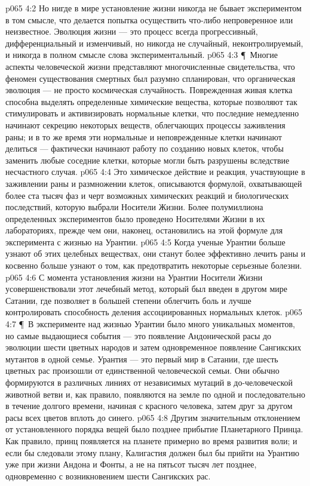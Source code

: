 \vs p065 4:2 Но нигде в мире установление жизни никогда не бывает экспериментом в том смысле, что делается попытка осуществить что\hyp{}либо непроверенное или неизвестное. Эволюция жизни --- это процесс всегда прогрессивный, дифференциальный и изменчивый, но никогда не случайный, неконтролируемый, и никогда в полном смысле слова экспериментальный.
\vs p065 4:3 \P\ Многие аспекты человеческой жизни представляют многочисленные свидетельства, что феномен существования смертных был разумно спланирован, что органическая эволюция --- не просто космическая случайность. Поврежденная живая клетка способна выделять определенные химические вещества, которые позволяют так стимулировать и активизировать нормальные клетки, что последние немедленно начинают секрецию некоторых веществ, облегчающих процессы заживления раны; и в то же время эти нормальные и неповрежденные клетки начинают делиться --- фактически начинают работу по созданию новых клеток, чтобы заменить любые соседние клетки, которые могли быть разрушены вследствие несчастного случая.
\vs p065 4:4 Это химическое действие и реакция, участвующие в заживлении раны и размножении клеток, описываются формулой, охватывающей более ста тысяч фаз и черт возможных химических реакций и биологических последствий, которую выбрали Носители Жизни. Более полумиллиона определенных экспериментов было проведено Носителями Жизни в их лабораториях, прежде чем они, наконец, остановились на этой формуле для эксперимента с жизнью на Урантии.
\vs p065 4:5 Когда ученые Урантии больше узнают об этих целебных веществах, они станут более эффективно лечить раны и косвенно больше узнают о том, как предотвратить некоторые серьезные болезни.
\vs p065 4:6 С момента установления жизни на Урантии Носители Жизни усовершенствовали этот лечебный метод, который был введен в другом мире Сатании, где позволяет в большей степени облегчить боль и лучше контролировать способность деления ассоциированных нормальных клеток.
\vs p065 4:7 \P\ В эксперименте над жизнью Урантии было много уникальных моментов, но самые выдающиеся события --- это появление Андонической расы до эволюции шести цветных народов и затем одновременное появление Сангикских мутантов в одной семье. Урантия --- это первый мир в Сатании, где шесть цветных рас произошли от единственной человеческой семьи. Они обычно формируются в различных линиях от независимых мутаций в до\hyp{}человеческой животной ветви и, как правило, появляются на земле по одной и последовательно в течение долгого времени, начиная с красного человека, затем друг за другом расы всех цветов вплоть до синего.
\vs p065 4:8 Другим значительным отклонением от установленного порядка вещей было позднее прибытие Планетарного Принца. Как правило, принц появляется на планете примерно во время развития воли; и если бы следовали этому плану, Калигастия должен был бы прийти на Урантию уже при жизни Андона и Фонты, а не на пятьсот тысяч лет позднее, одновременно с возникновением шести Сангикских рас.
